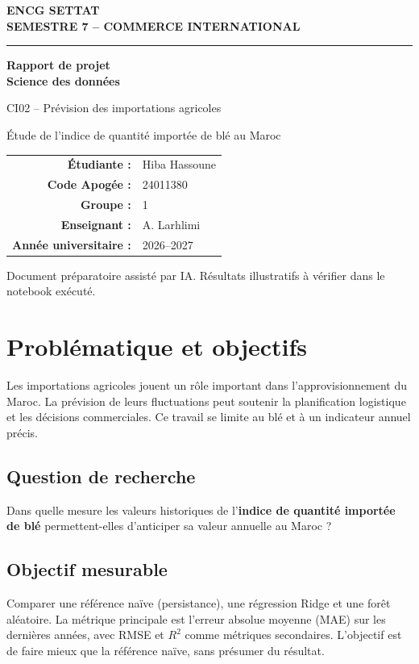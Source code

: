\documentclass[11pt,a4paper]{report}
\begin{document}
\begin{titlepage}\centering\vspace*{1.7cm}
{\large\color{teal}\bfseries ENCG SETTAT\\SEMESTRE 7 -- COMMERCE INTERNATIONAL\par}\vspace{1.4cm}
{\color{navy}\rule{\linewidth}{1.5pt}}\vspace{0.65cm}
{\Huge\bfseries Rapport de projet\\[0.3cm] Science des données\par}\vspace{0.55cm}
{\LARGE\color{teal} CI02 -- Prévision des importations agricoles\par}\vspace{0.3cm}
{\large Étude de l'indice de quantité importée de blé au Maroc\par}\vspace{0.7cm}{\color{navy}\rule{\linewidth}{1.5pt}}\vspace{1.5cm}
\begin{tabular}{rl}\textbf{Étudiante :}& Hiba Hassoune\\\textbf{Code Apogée :}& 24011380\\\textbf{Groupe :}& 1\\\textbf{Enseignant :}& A. Larhlimi\\\textbf{Année universitaire :}& 2026--2027\end{tabular}
\vfill\small\color{muted}Document préparatoire assisté par IA. Résultats illustratifs à vérifier dans le notebook exécuté.\end{titlepage}
\tableofcontents\clearpage
\chapter{Problématique et objectifs}
Les importations agricoles jouent un rôle important dans l'approvisionnement du Maroc. La prévision de leurs fluctuations peut soutenir la planification logistique et les décisions commerciales. Ce travail se limite au blé et à un indicateur annuel précis.
\section{Question de recherche}
Dans quelle mesure les valeurs historiques de l'\textbf{indice de quantité importée de blé} permettent-elles d'anticiper sa valeur annuelle au Maroc ?
\section{Objectif mesurable}
Comparer une référence naïve (persistance), une régression Ridge et une forêt aléatoire. La métrique principale est l'erreur absolue moyenne (MAE) sur les dernières années, avec RMSE et $R^2$ comme métriques secondaires. L'objectif est de faire mieux que la référence naïve, sans présumer du résultat.
\end{document}

